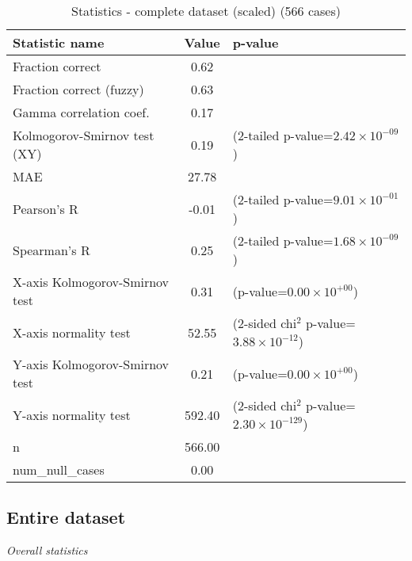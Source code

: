 \documentclass[10pt, letterpaper, oneside, titlepage, landscape]{scrreprt}
\begin{document}
\begin{table}[H]\begin{center}
\begin{tabular}{ l S[table-format=3.2] l}
Statistic name & {Value} & p-value\\
\hline
Fraction correct & 0.62 & \\
Fraction correct (fuzzy) & 0.63 & \\
Gamma correlation coef. & 0.17 & \\
Kolmogorov-Smirnov test (XY) & 0.19 & (2-tailed p-value=$2.42\times10^{-09}$)\\
MAE & 27.78 & \\
Pearson's R & -0.01 & (2-tailed p-value=$9.01\times10^{-01}$)\\
Spearman's R & 0.25 & (2-tailed p-value=$1.68\times10^{-09}$)\\
X-axis Kolmogorov-Smirnov test & 0.31 & (p-value=$0.00\times10^{+00}$)\\
X-axis normality test & 52.55 & (2-sided chi$^{2}$ p-value=$3.88\times10^{-12}$)\\
Y-axis Kolmogorov-Smirnov test & 0.21 & (p-value=$0.00\times10^{+00}$)\\
Y-axis normality test & 592.40 & (2-sided chi$^{2}$ p-value=$2.30\times10^{-129}$)\\
n & 566.00 & \\
num\_null\_cases & 0.00 & \\
\end{tabular}
\caption{Statistics - complete dataset (scaled) (566 cases)}
\end{center}\end{table}


\subsection{Entire dataset}
\textit{Overall statistics}
\end{document}
